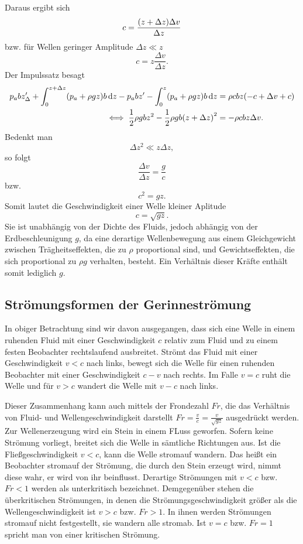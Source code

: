 \documentclass{lecture}
\begin{document}
    Daraus ergibt sich
    \[
        c = \frac{\parentheses*{z + \Delta z}\Delta v}{\Delta z}
    \]
    bzw. für Wellen geringer Amplitude \(\Delta z \ll z\)
    \[
        c = z\frac{\Delta v}{\Delta z}.
    \]
    Der Impulssatz besagt
    \begin{align*}
        p_a bz_{\Delta}' + \int_0^{z + \Delta z}\parentheses*{p_a + \rho gz}b\d z - p_a bz' - \int_0^z \parentheses*{p_a + \rho gz}b\d z &= \rho cbz\parentheses*{-c + \Delta v + c}\\
        \iff \frac{1}{2}\rho gbz^2 - \frac{1}{2}\rho gb\parentheses*{z + \Delta z}^2 &= -\rho cbz\Delta v.
    \end{align*}
    Bedenkt man
    \[
        \Delta z^2 \ll z\Delta z,
    \]
    so folgt
    \[
        \frac{\Delta v}{\Delta z} = \frac{g}{c}
    \]
    bzw.
    \[
        c^2 = gz.
    \]
    Somit lautet die Geschwindigkeit einer Welle kleiner Aplitude
    \[
        c = \sqrt{gz}.
    \]
    Sie ist unabhängig von der Dichte des Fluids, jedoch abhängig von der Erdbeschleunigung \(g\), da eine derartige Wellenbewegung aus einem Gleichgewicht zwischen Trägheitseffekten, die zu \(\rho\) proportional sind, und Gewichtseffekten, die sich proportional zu \(\rho g\) verhalten, besteht.
    Ein Verhältnis dieser Kräfte enthält somit lediglich \(g\).


    \subsection*{Strömungsformen der Gerinneströmung}

    In obiger Betrachtung sind wir davon ausgegangen, dass sich eine Welle in einem ruhenden Fluid mit einer Geschwindigkeit \(c\) relativ zum Fluid und zu einem festen Beobachter rechtslaufend ausbreitet.
    Strömt das Fluid mit einer Geschwindigkeit \(v < c\) nach links, bewegt sich die Welle für einen ruhenden Beobachter mit einer Geschwindigkeit \(c - v\) nach rechts.
    Im Falle \(v = c\) ruht die Welle und für \(v > c\) wandert die Welle mit \(v - c\) nach links.

    Dieser Zusammenhang kann auch mittels der Frondezahl \(Fr\), die das Verhältnis von Fluid- und Wellengeschwindigkeit darstellt \(Fr = \frac{v}{c} = \frac{v}{\sqrt{gz}}\) ausgedrückt werden.
    Zur Wellenerzeugung wird ein Stein in einem FLuss geworfen.
    Sofern keine Strömung vorliegt, breitet sich die Welle in sämtliche Richtungen aus.
    Ist die Fließgeschwindigkeit \(v < c\), kann die Welle stromauf wandern.
    Das heißt ein Beobachter stromauf der Strömung, die durch den Stein erzeugt wird, nimmt diese wahr, er wird von ihr beinflusst.
    Derartige Strömungen mit \(v < c\) bzw. \(Fr < 1\) werden als unterkritisch bezeichnet.
    Demgegenüber stehen die überkritischen Strömungen, in denen die Strömungsgeschwindigkeit größer als die Wellengeschwindigkeit ist \(v > c\) bzw. \(Fr > 1\).
    In ihnen werden Strömungen stromauf nicht festgestellt, sie wandern alle stromab.
    Ist \(v = c\) bzw. \(Fr = 1\) spricht man von einer kritischen Strömung.
\end{document}
